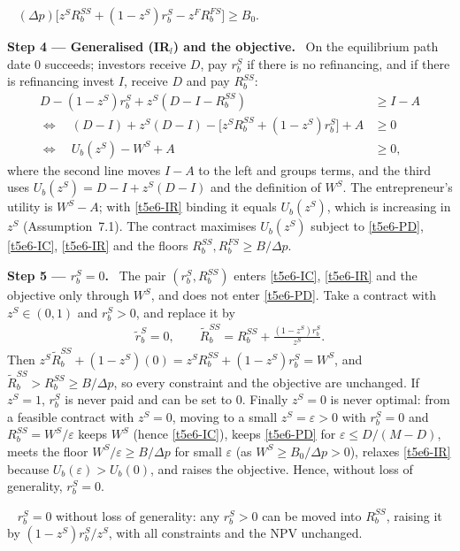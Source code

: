 \documentclass[11pt,a4paper]{article}
\newcommand{\step}[2]{\par\medskip\noindent\textbf{Step #1 --- #2.}~}
\newcommand{\answer}[1]{\par\smallskip\noindent\fbox{\textbf{Answer #1.}}~}
\begin{document}
\answer{(IC)} $(\Delta p)\bigl[z^SR_b^{SS}+(1-z^S)r_b^S-z^FR_b^{FS}\bigr]\ge B_0$.

\step{4}{Generalised (IR$_l$) and the objective} On the equilibrium path date 0 succeeds; investors
receive $D$, pay $r_b^S$ if there is no refinancing, and if there is refinancing invest $I$, receive $D$
and pay $R_b^{SS}$:
\begin{align}
  D-(1-z^S)r_b^S+z^S(D-I-R_b^{SS}) &\geq I-A \nonumber\\
  \Longleftrightarrow\quad (D-I)+z^S(D-I)-\bigl[z^SR_b^{SS}+(1-z^S)r_b^S\bigr]+A &\geq 0 \nonumber\\
  \Longleftrightarrow\quad U_b(z^S)-W^S+A &\geq 0, \label{t5e6-IR}
\end{align}
where the second line moves $I-A$ to the left and groups terms, and the third uses
$U_b(z^S)=D-I+z^S(D-I)$ and the definition of $W^S$.
The entrepreneur's utility is $W^S-A$; with \eqref{t5e6-IR} binding it equals $U_b(z^S)$, which is
increasing in $z^S$ (Assumption~7.1). The contract maximises $U_b(z^S)$ subject to \eqref{t5e6-PD},
\eqref{t5e6-IC}, \eqref{t5e6-IR} and the floors $R_b^{SS},R_b^{FS}\geq B/\Delta p$.

\step{5}{$r_b^S=0$} The pair $(r_b^S,R_b^{SS})$ enters \eqref{t5e6-IC}, \eqref{t5e6-IR} and the
objective only through $W^S$, and does not enter \eqref{t5e6-PD}. Take a contract with
$z^S\in(0,1)$ and $r_b^S>0$, and replace it by
\begin{align}
  \tilde r_b^S = 0,\qquad \tilde R_b^{SS} = R_b^{SS}+\frac{(1-z^S)r_b^S}{z^S}. \label{t5e6-shift}
\end{align}
Then $z^S\tilde R_b^{SS}+(1-z^S)(0)=z^SR_b^{SS}+(1-z^S)r_b^S=W^S$, and $\tilde R_b^{SS}>R_b^{SS}\geq B/\Delta p$,
so every constraint and the objective are unchanged. If $z^S=1$, $r_b^S$ is never paid and can be set to
0. Finally $z^S=0$ is never optimal: from a feasible contract with $z^S=0$, moving to a small
$z^S=\varepsilon>0$ with $r_b^S=0$ and $R_b^{SS}=W^S/\varepsilon$ keeps $W^S$ (hence \eqref{t5e6-IC}), keeps
\eqref{t5e6-PD} for $\varepsilon\leq D/(M-D)$, meets the floor $W^S/\varepsilon\geq B/\Delta p$ for
small $\varepsilon$ (as $W^S\geq B_0/\Delta p>0$), relaxes \eqref{t5e6-IR} because $U_b(\varepsilon)>U_b(0)$,
and raises the objective. Hence, without loss of generality, $r_b^S=0$.

\answer{($r_b^S$)} $r_b^S=0$ without loss of generality: any $r_b^S>0$ can be moved into $R_b^{SS}$,
raising it by $(1-z^S)r_b^S/z^S$, with all constraints and the NPV unchanged.
\end{document}
